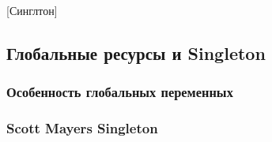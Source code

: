 [Синглтон]

\subsection{Глобальные ресурсы и Singleton}
\label{section::Singleton}

\subsubsection{Особенность глобальных переменных}

\subsubsection{Scott Mayers Singleton}
